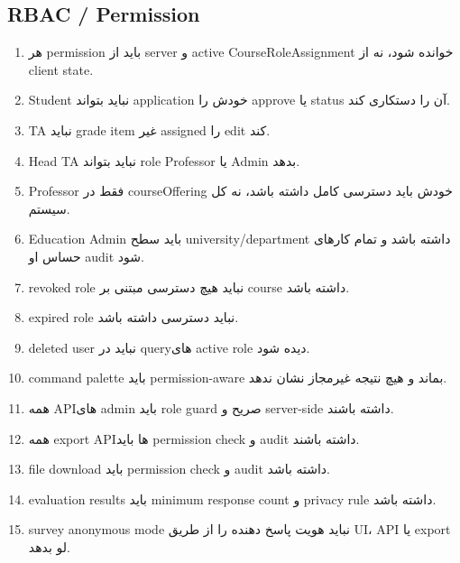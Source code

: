 \documentclass[11pt,a4paper]{article}
\begin{document}
\subsection{RBAC / Permission}
\begin{enumerate}[label=\arabic*. ,resume]
\item هر permission باید از server و active CourseRoleAssignment خوانده شود، نه از client state.
\item Student نباید بتواند application خودش را approve یا status آن را دستکاری کند.
\item TA نباید grade item غیر assigned را edit کند.
\item Head TA نباید بتواند role Professor یا Admin بدهد.
\item Professor فقط در courseOffering خودش باید دسترسی کامل داشته باشد، نه کل سیستم.
\item Education Admin باید سطح university/department داشته باشد و تمام کارهای حساس او audit شود.
\item revoked role نباید هیچ دسترسی مبتنی بر course داشته باشد.
\item expired role نباید دسترسی داشته باشد.
\item deleted user نباید در queryهای active role دیده شود.
\item command palette باید permission-aware بماند و هیچ نتیجه غیرمجاز نشان ندهد.
\item همه APIهای admin باید role guard صریح و server-side داشته باشند.
\item همه export APIها باید permission check و audit داشته باشند.
\item file download باید permission check و audit داشته باشد.
\item evaluation results باید minimum response count و privacy rule داشته باشد.
\item survey anonymous mode نباید هویت پاسخ دهنده را از طریق UI، API یا export لو بدهد.
\end{enumerate}
\end{document}
